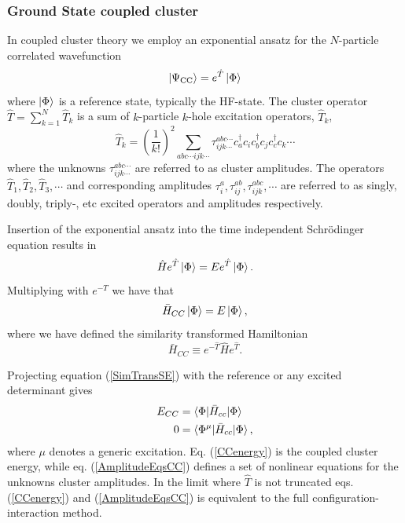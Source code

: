 \documentclass[aip,jcp,reprint,floatfix]{revtex4-1}
\begin{document}
    \subsubsection{Ground State coupled cluster}
    In coupled cluster theory we employ an exponential ansatz for the $N$-particle correlated wavefunction 
    \begin{equation}
       \ket{\Psi_{\text{CC}}} = e^{\hat{T}}\ket{\Phi} 
    \end{equation}
    where $\ket{\Phi}$ is a reference state, typically the HF-state. The cluster operator $\hat{T} = \sum_{k=1}^N \hat{T}_k$ is a sum of $k$-particle $k$-hole excitation operators, $\hat{T}_k$, 
    \begin{equation}
        \hat{T}_k = \left(\frac{1}{k!}\right)^2 \sum_{abc\cdots ijk\cdots} \tau^{abc\cdots}_{ijk\cdots}   c_a^\dagger  c_i c_b^\dagger c_j  c_c^\dagger c_k \cdots 
    \end{equation}
    where the unknowns $\tau^{abc\cdots}_{ijk\cdots}$ are referred to as cluster amplitudes. The operators $\hat{T}_1, \hat{T}_2, \hat{T}_3, \cdots$ and corresponding amplitudes $\tau^a_i, \tau^{ab}_{ij}, \tau^{abc}_{ijk},\cdots$ are referred to as singly, doubly, triply-, etc excited operators and amplitudes respectively.
    
    Insertion of the exponential ansatz into the time independent Schrödinger equation results in 
    \begin{equation}
        \hat{H}e^{\hat{T}} \ket{\Phi} = E e^{\hat{T}} \ket{\Phi}.
    \end{equation}
    Multiplying with $e^{-T}$ we have that 
    \begin{equation}
        \bar{H}_{CC} \ket{\Phi} = E \ket{\Phi} \label{SimTransSE},
    \end{equation}
    where we have defined the similarity transformed Hamiltonian 
    \begin{equation}
        \bar{H}_{CC} \equiv e^{-\hat{T}}\hat{H}e^{\hat{T}}.
    \end{equation}
    
    Projecting equation (\ref{SimTransSE}) with the reference or any excited determinant gives 
    \begin{align}
        E_{CC} &= \braket{\Phi|\bar{H}_{cc}|\Phi} \label{CCenergy} \\
        0 &= \braket{\Phi^\mu|\bar{H}_{cc}|\Phi} \label{AmplitudeEqsCC},
    \end{align}
    where $\mu$ denotes a generic excitation. Eq. (\ref{CCenergy}) is the coupled cluster energy, while eq. (\ref{AmplitudeEqsCC}) defines a set of nonlinear equations for the unknowns cluster amplitudes. In the limit where $\hat{T}$ is not truncated eqs. (\ref{CCenergy}) and (\ref{AmplitudeEqsCC}) is equivalent to the full configuration-interaction method\cite{VarCC_2013}.
    
\end{document}
